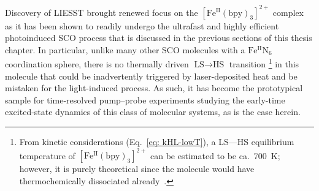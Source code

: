 Discovery of LIESST brought renewed focus on the $\mathrm{[Fe^{II}(bpy)_3]^{2+}}$ complex
as it has been shown to readily undergo the ultrafast and highly efficient photoinduced SCO process
that is discussed in the previous sections of this thesis chapter.
%
In particular, unlike many other SCO molecules with a $\mathrm{Fe^{II} N_6}$ coordination sphere,
there is no thermally driven $\text{LS} \rightarrow \text{HS}$ transition%
\footnote{
From kinetic considerations (Eq.~\eqref{eq: kHL-lowT}),
a LS---HS equilibrium temperature of $\mathrm{[Fe^{II}(bpy)_3]^{2+}}$
can be estimated to be ca.~700~K;
however, it is purely theoretical since the molecule would have
thermochemically dissociated already~\cite{SCO-II}.}
in this molecule that could be inadvertently triggered by laser-deposited heat
and be mistaken for the light-induced process.
%
As such, it has become the prototypical sample for
time-resolved pump--probe experiments studying
the early-time excited-state dynamics of this class of molecular systems,
as is the case herein.














